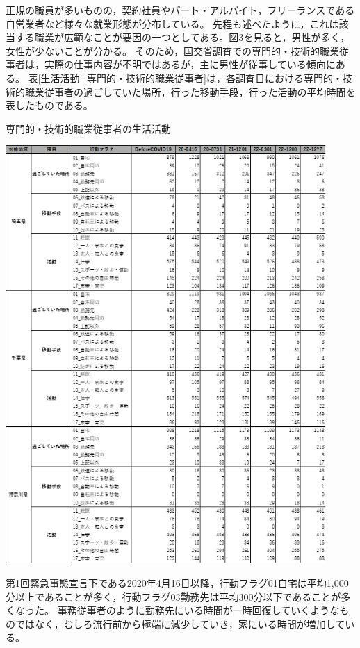 \documentclass[paper={210mm,297mm},fontsize=15Q,line_length=35zw,number_of_lines=31,head_space=30mm,gutter=40mm,baselineskip=2.0zw,headfoot_verticalposition=1.5zw]{jlreq}
\begin{document}
正規の職員が多いものの，契約社員やパート・アルバイト，フリーランスである自営業者など様々な就業形態が分布している。
先程も述べたように，これは該当する職業が広範なことが要因の一つとしてある。図3を見ると，男性が多く，女性が少ないことが分かる。
そのため，国交省調査での専門的・技術的職業従事者は，実際の仕事内容が不明ではあるが，主に男性が従事している傾向にある。
表\ref{生活活動_専門的・技術的職業従事者}は，各調査日における専門的・技術的職業従事者の過ごしていた場所，行った移動手段，行った活動の平均時間を表したものである。

\begin{table}[H]
  \centering
  \caption{専門的・技術的職業従事者の生活活動}
  \includegraphics[width=122mm]{../Figure/c04s03_table_専門的・技術的職業従事者_生活活動.png}
  \label{生活活動_専門的・技術的職業従事者}
\end{table}

第1回緊急事態宣言下である2020年4月16日以降，行動フラグ01自宅は平均1,000分以上であることが多く，行動フラグ03勤務先は平均300分以下であることが多くなった。
事務従事者のように勤務先にいる時間が一時回復していくようなものではなく，むしろ流行前から極端に減少していき，家にいる時間が増加している。
\end{document}
